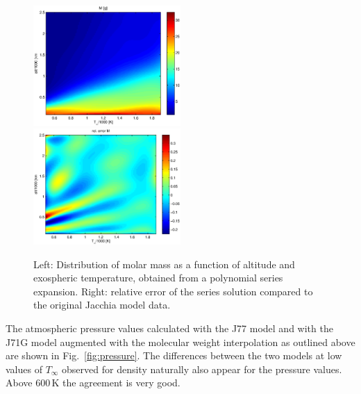 \documentclass[Orbiter Technical Reference.tex]{subfiles}
\begin{document}
\begin{figure}
\includegraphics[width=0.5\textwidth]{molmass.eps}
\includegraphics[width=0.5\textwidth]{molmass_err.eps}
\caption{Left: Distribution of molar mass as a function of altitude and exospheric temperature, obtained from a polynomial series expansion. Right: relative error of the series solution compared to the original Jacchia model data.}
\label{fig:molmass}
\end{figure}
The atmospheric pressure values calculated with the J77 model and with the J71G model augmented with the molecular weight interpolation as outlined above are shown in Fig.~\ref{fig:pressure}. The differences between the two models at low values of $T_\infty$ observed for density naturally also appear for the pressure values. Above 600\,K the agreement is very good.
\end{document}
